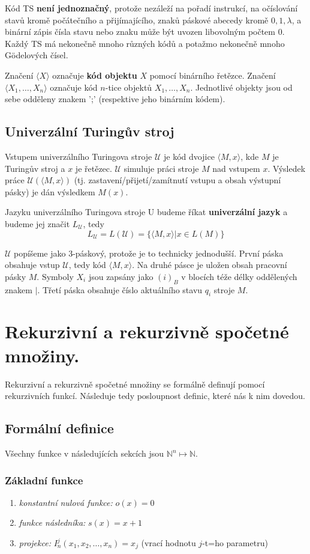 \documentclass[11pt]{report} %
\newcommand{\N}{\mathbb{N}}
\numberwithin{equation}{section}
\begin{document}
Kód TS \textbf{není jednoznačný}, protože nezáleží na pořadí instrukcí, na očíslování stavů kromě počátečního a přijímajícího, znaků páskové abecedy kromě $0, 1, \lambda$, a binární zápis čísla stavu nebo znaku může být uvozen
libovolným počtem 0. Každý TS má nekonečně mnoho různých kódů a potažmo nekonečně mnoho Gödelových čísel.

Značení $\langle X \rangle$ označuje \textbf{kód objektu} $X$ pomocí binárního řetězce. Značení $\langle X_1, \dots, X_n\rangle$ označuje kód $n$-tice objektů $X_1, \dots, X_n$. Jednotlivé objekty jsou od sebe odděleny znakem ';' (respektive jeho binárním kódem).

\subsection{Univerzální Turingův stroj}
Vstupem univerzálního Turingova stroje $\mathcal{U}$ je kód dvojice $\langle M, x \rangle$, kde $M$ je Turingův stroj a $x$ je řetězec. $\mathcal{U}$ simuluje práci stroje $M$ nad vstupem $x$. Výsledek práce $\mathcal{U}(\langle M, x \rangle)$ (tj. zastavení/přijetí/zamítnutí vstupu a obsah výstupní pásky) je dán výsledkem $M(x)$.

Jazyku univerzálního Turingova stroje U budeme říkat \textbf{univerzální jazyk} a budeme jej značit $L_\mathcal{U}$, tedy
$$L_\mathcal{U} = L(\mathcal{U}) = \{\langle M, x \rangle | x \in L(M)\}$$

$\mathcal{U}$ popíšeme jako 3-páskový, protože je to technicky jednodušší. První páska obsahuje vstup $\mathcal{U}$, tedy kód $\langle M, x \rangle$. Na druhé pásce je uložen obsah pracovní pásky $M$. Symboly $X_i$ jsou zapsány jako $(i)_B$ v blocích téže délky oddělených znakem $|$. Třetí páska obsahuje číslo aktuálního stavu $q_i$ stroje $M$.


\section{Rekurzivní a rekurzivně spočetné množiny.}
Rekurzivní a rekurzivně spočetné množiny se formálně definují pomocí rekurzivních funkcí. Následuje tedy posloupnost definic, které nás k nim dovedou.

\subsection{Formální definice}
Všechny funkce v následujících sekcích jsou $\N^n \mapsto \N$.

\subsubsection{Základní funkce}
\begin{enumerate}[label=\Roman*.]
	\item \textit{konstantní nulová funkce:} $o(x) = 0$
	\item \textit{funkce následníka:} $s(x) = x + 1$
	\item \textit{projekce:} $I_n^j(x_1, x_2, \dots, x_n) = x_j$ (vrací hodnotu $j$-t=ho parametru)
\end{enumerate}
\end{document}
